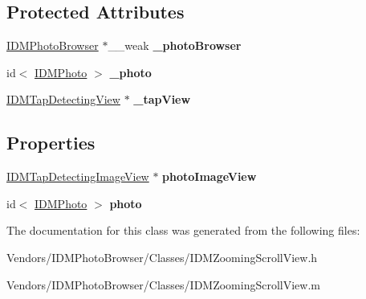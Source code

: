 \subsection*{Protected Attributes}
\begin{DoxyCompactItemize}
\item 
\hypertarget{interface_i_d_m_zooming_scroll_view_aeb0c3a4e963c648ff0882989ff527fe5}{}\hyperlink{interface_i_d_m_photo_browser}{I\+D\+M\+Photo\+Browser} $\ast$\+\_\+\+\_\+weak {\bfseries \+\_\+photo\+Browser}\label{interface_i_d_m_zooming_scroll_view_aeb0c3a4e963c648ff0882989ff527fe5}

\item 
\hypertarget{interface_i_d_m_zooming_scroll_view_a30256013f4ca320fe8268d8c6425047a}{}id$<$ \hyperlink{interface_i_d_m_photo}{I\+D\+M\+Photo} $>$ {\bfseries \+\_\+photo}\label{interface_i_d_m_zooming_scroll_view_a30256013f4ca320fe8268d8c6425047a}

\item 
\hypertarget{interface_i_d_m_zooming_scroll_view_a29390867d15f5ddbbb5ff8afc2ca93f1}{}\hyperlink{interface_i_d_m_tap_detecting_view}{I\+D\+M\+Tap\+Detecting\+View} $\ast$ {\bfseries \+\_\+tap\+View}\label{interface_i_d_m_zooming_scroll_view_a29390867d15f5ddbbb5ff8afc2ca93f1}

\end{DoxyCompactItemize}
\subsection*{Properties}
\begin{DoxyCompactItemize}
\item 
\hypertarget{interface_i_d_m_zooming_scroll_view_a27bca1d2f55314d0a4505af001c83166}{}\hyperlink{interface_i_d_m_tap_detecting_image_view}{I\+D\+M\+Tap\+Detecting\+Image\+View} $\ast$ {\bfseries photo\+Image\+View}\label{interface_i_d_m_zooming_scroll_view_a27bca1d2f55314d0a4505af001c83166}

\item 
\hypertarget{interface_i_d_m_zooming_scroll_view_a56046daadbe0af2ea05709c6f07d5b41}{}id$<$ \hyperlink{interface_i_d_m_photo}{I\+D\+M\+Photo} $>$ {\bfseries photo}\label{interface_i_d_m_zooming_scroll_view_a56046daadbe0af2ea05709c6f07d5b41}

\end{DoxyCompactItemize}


The documentation for this class was generated from the following files\+:\begin{DoxyCompactItemize}
\item 
Vendors/\+I\+D\+M\+Photo\+Browser/\+Classes/I\+D\+M\+Zooming\+Scroll\+View.\+h\item 
Vendors/\+I\+D\+M\+Photo\+Browser/\+Classes/I\+D\+M\+Zooming\+Scroll\+View.\+m\end{DoxyCompactItemize}
